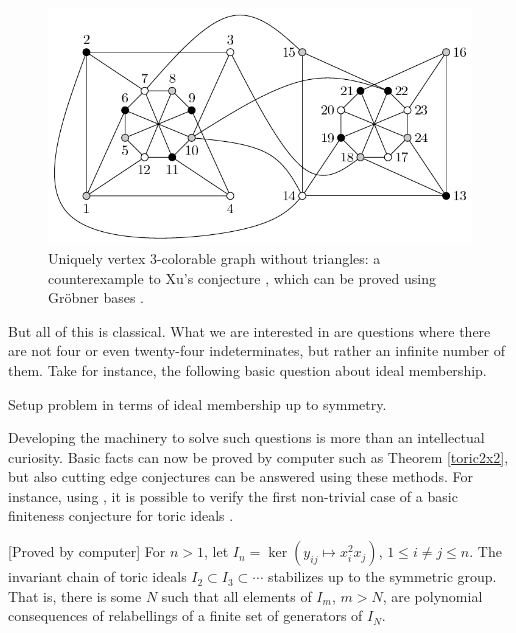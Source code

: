 \begin{figure}
\begin{center}
\includegraphics[width=.8 \linewidth]{akbarigraph.pdf}
\caption{Uniquely vertex 3-colorable graph without triangles: a counterexample \cite{akbari2001kr} to Xu's conjecture \cite{shaoji1990size}, which can be proved using Gr\"obner bases \cite{hillar2008algebraic}.}\label{graph}
\end{center}
\end{figure}

But all of this is classical.  What we are interested in are questions where there are not four or even twenty-four indeterminates, but rather an infinite number of them.  Take for instance, the following basic question about ideal membership.  

Setup problem in terms of ideal membership up to symmetry.  

Developing the machinery to solve such questions is more than an intellectual curiosity.  Basic facts can now be proved by computer such as Theorem \ref{toric2x2}, but also cutting edge conjectures can be answered using these methods.  For instance, using \cite{EquivariantGB}, it is possible to verify the first non-trivial case of a basic finiteness conjecture for toric ideals \cite{draisma2013noetherianity}.  

\begin{theorem}\label{monomthm}[Proved by computer]
For $n > 1$, let $I_n = \ker (y_{ij} \mapsto x_i^2 x_j)$, $1 \leq i \neq j \leq n$.  The invariant chain of toric ideals $I_2 \subset I_3 \subset \cdots$ stabilizes up to the symmetric group.  That is, there is some $N$ such that all elements of $I_m$, $m > N$, are polynomial consequences of relabellings of a finite set of generators of $I_N$.
\end{theorem}


